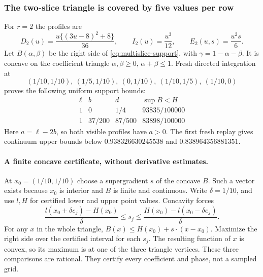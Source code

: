 \subsubsection{The two-slice triangle is covered by five values per row}
For $r=2$ the profiles are
\[
 D_2(u)=\frac{u\{(3u-8)^2+8\}}{36},\qquad
 I_2(u)=\frac{u^3}{12},\qquad E_2(u,s)=\frac{u^2s}{6}.
\]
Let $B(\alpha,\beta)$ be the right side of
\eqref{eq:multislice-support}, with $\gamma=1-\alpha-\beta$.
It is concave on the coefficient triangle
$\alpha,\beta\ge0$, $\alpha+\beta\le1$.
Fresh directed integration at
\[
 (1/10,1/10),\ (1/5,1/10),\ (0,1/10),\
 (1/10,1/5),\ (1/10,0)
\]
proves the following uniform support bounds:
\[
\begin{array}{c|c|c|c}
 \ell&b&d&\sup B<H\\\hline
 1&0&1/4&93835/100000\\
 1&37/200&87/500&83898/100000
\end{array}
\]
Here $a=\ell-2b$, so both visible profiles have $a>0$.
The first fresh replay gives continuum upper bounds below
$0.938326630245538$ and $0.838964356881351$.

\paragraph{A finite concave certificate, without derivative estimates.}
At $x_0=(1/10,1/10)$ choose a supergradient $s$ of the concave $B$.
Such a vector exists because $x_0$ is interior and $B$ is finite and
continuous. Write $\delta=1/10$, and use $l,H$ for certified lower
and upper point values. Concavity forces
\[
 \frac{l(x_0+\delta e_j)-H(x_0)}\delta
 \le s_j\le
 \frac{H(x_0)-l(x_0-\delta e_j)}\delta.
\]
For any $x$ in the whole triangle,
$B(x)\le H(x_0)+s\cdot(x-x_0)$.
Maximize the right side over the certified interval for each $s_j$.
The resulting function of $x$ is convex, so its maximum is at one of
the three triangle vertices. These three comparisons are rational.
They certify every coefficient and phase, not a sampled grid.

